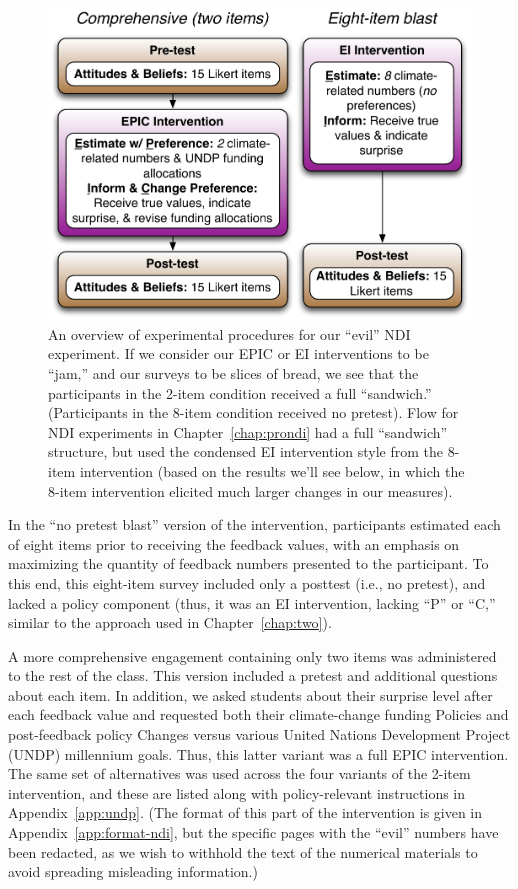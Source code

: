 \begin{figure}[h]
    \includegraphics[width=6.5in]{evil-ndi-survey-flow.pdf}
    \caption{An overview of experimental procedures for our “evil” NDI
        experiment. If we consider our EPIC or EI interventions to be “jam,” and
        our surveys to be slices of bread, we see that the participants in the
        2-item condition received a full “sandwich.” (Participants in the 8-item
        condition received no pretest).  Flow for NDI experiments in
        Chapter~\ref{chap:prondi} had a full “sandwich” structure, but used the
        condensed EI intervention style from the 8-item intervention (based on
        the results we'll see below, in which the 8-item intervention elicited
        much larger changes in our measures).}
    \label{fig:evil-flow}
\end{figure}

In the “no pretest blast” version of the intervention, participants estimated
each of eight items prior to receiving the feedback values, with an emphasis on
maximizing the quantity of feedback numbers presented to the participant. To
this end, this eight-item survey included only a posttest (i.e., no pretest),
and lacked a policy component (thus, it was an EI intervention, lacking ``P'' or
``C,'' similar to the approach used in Chapter~\ref{chap:two}). 

A more comprehensive engagement containing only two items was administered to
the rest of the class. This version included a pretest and additional questions
about each item. In addition, we asked students about their surprise level after
each feedback value and requested both their climate-change funding Policies and
post-feedback policy Changes versus various United Nations Development Project
(UNDP) millennium goals.  Thus, this
latter variant was a full EPIC intervention. The same set of alternatives was
used across the four variants of the 2-item intervention, and these are listed
along with policy-relevant instructions in Appendix~\ref{app:undp}. (The
format of this part of the intervention is given in
Appendix~\ref{app:format-ndi}, but the specific pages with the “evil” numbers
have been redacted, as we wish to withhold the text of the numerical
materials to avoid spreading misleading information.)


